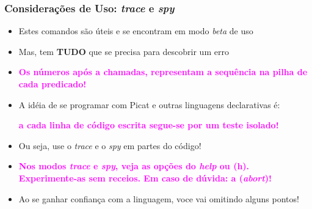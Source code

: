 \begin{frame}[fragile]

\frametitle{Considerações de Uso: \textit{trace} e \textit{spy} }

\begin{itemize}
  \item Estes comandos são úteis e se encontram em modo \textit{beta} de uso
  
  \item Mas, tem \textbf{TUDO} que se precisa para descobrir um erro
    \pause
    \item   \textcolor{magenta}{\textbf{Os números após a chamadas, representam a sequência na pilha de cada predicado!}} 

  
  \pause
  \item A idéia de se programar com Picat e outras linguagens
  declarativas é: 

  \pause
  \textcolor{magenta}{\textbf{a cada linha de código escrita segue-se por um teste isolado!}}

  \pause
  \item Ou seja,  use o \textit{trace} e o \textit{spy} em partes do código!

   \pause
    \item   \textcolor{magenta}{\textbf{Nos modos \textit{trace} e \textit{spy}, veja as opções do \textit{help} ou (h).\\
    Experimente-as sem receios. Em caso de dúvida: a (\textit{abort})!}} 

  \pause
  \item Ao se ganhar confiança com a linguagem, voce vai omitindo alguns pontos!

  
\end{itemize}

\end{frame}


